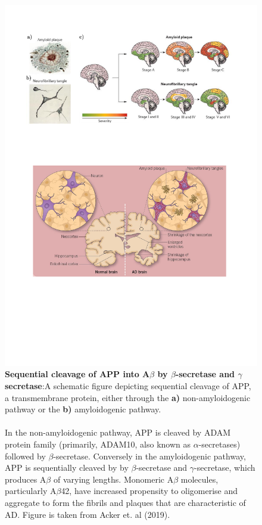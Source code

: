 \begin{figure}[!htp]
	\centering
	\includegraphics[page=2,trim={0.5cm 9cm 0cm 15cm},clip, scale = 0.8]{Figures/Introduction_Figures.pdf}
	\captionsetup{width=0.95\textwidth,singlelinecheck=off}
	\caption[Sequential cleavage of APP into A$\beta$ by $\beta$-secretase and $\gamma$ secretase]%
	{\textbf{Sequential cleavage of APP into A$\beta$ by $\beta$-secretase and $\gamma$ secretase}:A schematic figure depicting sequential cleavage of APP, a transmembrane protein, either through the \textbf{a)} non-amyloidogenic pathway or the \textbf{b)} amyloidogenic pathway.
	\\
	\\
	In the non-amyloidogenic pathway, APP is cleaved by ADAM protein family (primarily, ADAM10, also known as $\alpha$-secretases) followed by $\beta$-secretase. Conversely in the amyloidogenic pathway, APP is sequentially cleaved by by $\beta$-secretase and $\gamma$-secretase, which produces A$\beta$ of varying lengths. Monomeric A$\beta$ molecules, particularly A$\beta$42, have increased propensity to oligomerise and aggregate to form the fibrils and plaques that are characteristic of AD. Figure is taken from Acker et. al (2019)\cite{Acker2019}. 
	}
	\label{fig:APP_Processing}
\end{figure}

